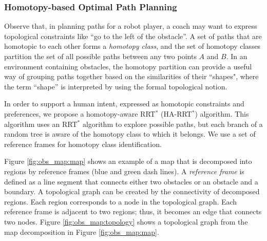 \documentclass[phd]{byuprop}
\begin{document}
\subsubsection{Homotopy-based Optimal Path Planning}
\label{sec:project_description:homotopy_based_path_planning}

Observe that, in planning paths for a robot player, a coach may want to express topological constraints like ``go to the left of the obstacle''.
A set of paths that are homotopic to each other forms a \emph{homotopy class}, and the  set of homotopy classes partition the set of all possible paths between any two points $A$ and $B$.
In an environment containing obstacles, the homotopy partition can provide a useful way of grouping paths together based on the similarities of their ``shapes", where the term ``shape'' is interpreted by using the formal topological notion.

In order to support a human intent, expressed as homotopic constraints and preferences, we propose a homotopy-aware RRT$^{*}$ (HA-RRT$^{*}$) algorithm. 
This algorithm uses an RRT$^*$ algorithm to explore possible paths, but each branch of a random tree is aware of the homotopy class to which it belongs. 
We use a set of reference frames for homotopy class identification.

Figure \ref{fig:obs_map:map} shows an example of a map that is decomposed into regions by reference frames (blue and green dash lines).
A \emph{reference frame} is defined as a line segment that connects either two obstacles or an obstacle and a boundary.
A topological graph can be created by the connectivity of decomposed regions.
Each region corresponds to a node in the topological graph.
Each reference frame is adjacent to two regions; thus, it becomes an edge that connects two nodes.
Figure \ref{fig:obs_map:topology} shows a topological graph from the map decomposition in Figure \ref{fig:obs_map:map}.
\end{document}

